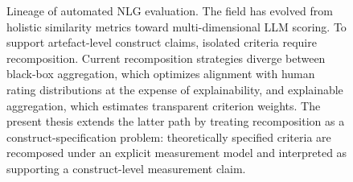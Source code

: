 \begin{figure}[t]
{%
}
\caption{Lineage of automated NLG evaluation. The field has evolved from holistic similarity metrics toward multi-dimensional LLM scoring. To support artefact-level construct claims, isolated criteria require recomposition. Current recomposition strategies diverge between black-box aggregation, which optimizes alignment with human rating distributions at the expense of explainability, and explainable aggregation, which estimates transparent criterion weights. The present thesis extends the latter path by treating recomposition as a construct-specification problem: theoretically specified criteria are recomposed under an explicit measurement model and interpreted as supporting a construct-level measurement claim.}
\label{fig:lit_review_lineage}
\end{figure}